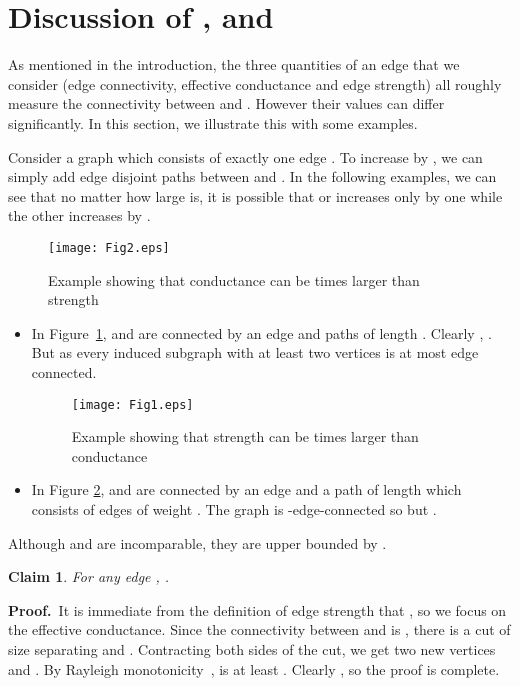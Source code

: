 \documentclass[11pt]{article}
\newcommand{\proofbelow}{8pt}
\numberwithin{equation}{section}
\newtheorem{claim}[theorem]{Claim}
\renewenvironment{proof}{\noindent\textbf{Proof.}\,}{\afterproof}
\newcommand{\afterproof}{\hfill  \par \vspace{\proofbelow}}
\newcommand{\AppendixName}[1]{\label{app:#1}}
\newcommand{\ClaimName}[1]{\label{clm:#1}}
\newcommand{\FigureName}[1]{\label{fig:#1}}
\newcommand{\Figure}[1]{Figure~\ref{fig:#1}}
\begin{document}


\appendix



\section{Discussion of ,  and }
\AppendixName{gapexample}

As mentioned in the introduction,
the three quantities of an edge  that we consider
(edge connectivity, effective conductance and edge strength)
all roughly measure the connectivity between  and .
However their values can differ significantly.
In this section, we illustrate this with some examples.

Consider a graph which consists of exactly one edge .
To increase  by ,
we can simply add  edge disjoint paths between  and .
In the following examples, we can see that no matter how large  is,
it is possible that  or  increases only by one
while the other increases by .

\begin{figure}
	\centering
    \texttt{[image: Fig2.eps]}
	\caption{Example showing that conductance can be  times larger than strength}
	\FigureName{example1}
\end{figure}

\begin{itemize}
\item
In \Figure{example1},
 and  are connected by an edge 
and  paths of length .
Clearly , 
.
But  as every induced subgraph with at least two vertices is at most  edge connected.

\begin{figure}
	\centering
    \texttt{[image: Fig1.eps]}
	\caption{Example showing that strength can be  times larger than conductance}
	\label{example2}
\end{figure}

\item
In Figure \ref{example2},
 and  are connected by an edge 
and a path of length 
which consists of edges of weight .
The graph is -edge-connected so
 but .
\end{itemize}

Although  and  are incomparable, they are upper bounded by .

\begin{claim}
\ClaimName{ck}
For any edge , .
\end{claim}
\begin{proof}
It is immediate from the definition of edge strength that ,
so we focus on the effective conductance.
Since the connectivity between  and  is ,
there is a cut of size  separating  and .
Contracting both sides of the cut, 
we get two new vertices  and .
By Rayleigh monotonicity~\cite{DoyleSnell},  is at least .
Clearly , so the proof is complete.
\end{proof}
\end{document}
